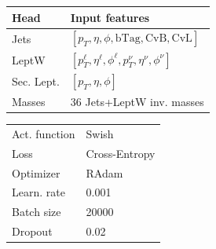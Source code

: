 \begin{minipage}{0.58\linewidth}
\begin{table}[H]
    \centering
    \fontsize{11.8pt}{11.8pt}\selectfont
    \begin{tabular}{l|l}
    \toprule
        \textbf{Head} & \textbf{Input features} \\
    \midrule
         Jets & $[p_T,\eta,\phi,\text{bTag},\text{CvB},\text{CvL}]$ \\
         \midrule
         LeptW & $[p_T^\ell,\eta^\ell,\phi^\ell,p_T^\nu,\eta^\nu,\phi^\nu]$\\
         \midrule
         Sec. Lept.& $[p_T,\eta,\phi]$ \\
         \midrule
         Masses & 36 Jets+LeptW inv. masses\\
         \bottomrule
    \end{tabular}
    \label{tab:sbanet_inputs}
\end{table}
\end{minipage}
\hfill
\begin{minipage}{0.4\linewidth}
    \begin{table}[H]
    \centering
    \begin{tabular}{l|l}
    \toprule
        Act. function & Swish\\
        Loss& Cross-Entropy\\
        Optimizer & RAdam \\
        Learn. rate & 0.001\\
        Batch size & 20000\\
        Dropout  & 0.02\\  
        \bottomrule
    \end{tabular}
\end{table}
\end{minipage}

